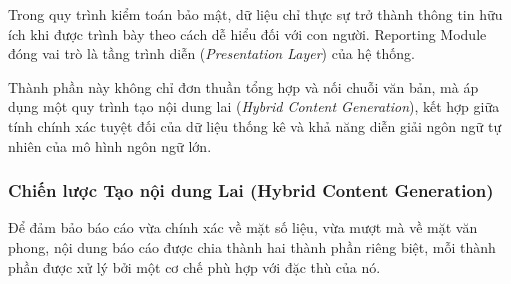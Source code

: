 Trong quy trình kiểm toán bảo mật,
dữ liệu chỉ thực sự trở thành
thông tin hữu ích
khi được trình bày
theo cách dễ hiểu
đối với con người.
Reporting Module
đóng vai trò
là tầng trình diễn
(\textit{Presentation Layer})
của hệ thống.

Thành phần này
không chỉ đơn thuần
tổng hợp và nối chuỗi văn bản,
mà áp dụng
một quy trình tạo nội dung lai
(\textit{Hybrid Content Generation}),
kết hợp giữa
tính chính xác tuyệt đối
của dữ liệu thống kê
và khả năng diễn giải
ngôn ngữ tự nhiên
của mô hình ngôn ngữ lớn.

\subsubsection*{Chiến lược Tạo nội dung Lai (Hybrid Content Generation)}

Để đảm bảo báo cáo vừa chính xác về mặt số liệu, vừa mượt mà về mặt văn phong, nội dung báo cáo được chia thành hai thành phần riêng biệt, mỗi thành phần được xử lý bởi một cơ chế phù hợp với đặc thù của nó.

